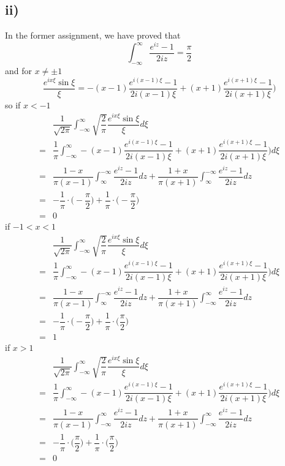 \documentclass[a4paper,12pt,titlepage]{article}
\begin{document}
\subsection*{ii)}
In the former assignment, we have proved that $$\int_{-\infty}^{\infty}\dfrac{e^{iz}-1}{2iz}=\dfrac{\pi}{2}$$
and for $x\neq\pm1$
$$\dfrac{e^{ix\xi}\sin\xi}{\xi}=-(x-1)\dfrac{e^{i(x-1)\xi}-1}{2i(x-1)\xi}+(x+1)\dfrac{e^{i(x+1)\xi
}-1}{2i(x+1)\xi})$$ 
so if $x<-1$
\begin{align*}
&\dfrac{1}{\sqrt{2\pi}}\int_{-\infty}^{\infty}\sqrt{\dfrac{2}{\pi}}\dfrac{e^{ix\xi}\sin\xi}{\xi}d\xi\\
=&\dfrac{1}{\pi}\int_{-\infty}^{\infty}-(x-1)\dfrac{e^{i(x-1)\xi}-1}{2i(x-1)\xi}+(x+1)\dfrac{e^{i(x+1)\xi
}-1}{2i(x+1)\xi})d\xi\\
=&\dfrac{1-x}{\pi(x-1)}\int_{\infty}^{-\infty}\dfrac{e^{iz}-1}{2iz}dz+\dfrac{1+x}{\pi(x+1)}\int_{\infty}^{-\infty}\dfrac{e^{iz}-1}{2iz}dz\\
=&-\dfrac{1}{\pi}\cdot\Big(-\dfrac{\pi}{2}\Big)+\dfrac{1}{\pi}\cdot\Big(-\dfrac{\pi}{2}\Big)\\
=&0
\end{align*}
if $-1<x<1$
\begin{align*}
&\dfrac{1}{\sqrt{2\pi}}\int_{-\infty}^{\infty}\sqrt{\dfrac{2}{\pi}}\dfrac{e^{ix\xi}\sin\xi}{\xi}d\xi\\
=&\dfrac{1}{\pi}\int_{-\infty}^{\infty}-(x-1)\dfrac{e^{i(x-1)\xi}-1}{2i(x-1)\xi}+(x+1)\dfrac{e^{i(x+1)\xi
}-1}{2i(x+1)\xi})d\xi\\
=&\dfrac{1-x}{\pi(x-1)}\int_{\infty}^{-\infty}\dfrac{e^{iz}-1}{2iz}dz+\dfrac{1+x}{\pi(x+1)}\int_{-\infty}^{\infty}\dfrac{e^{iz}-1}{2iz}dz\\
=&-\dfrac{1}{\pi}\cdot\Big(-\dfrac{\pi}{2}\Big)+\dfrac{1}{\pi}\cdot\Big(\dfrac{\pi}{2}\Big)\\
=&1
\end{align*}
if $x>1$
\begin{align*}
&\dfrac{1}{\sqrt{2\pi}}\int_{-\infty}^{\infty}\sqrt{\dfrac{2}{\pi}}\dfrac{e^{ix\xi}\sin\xi}{\xi}d\xi\\
=&\dfrac{1}{\pi}\int_{-\infty}^{\infty}-(x-1)\dfrac{e^{i(x-1)\xi}-1}{2i(x-1)\xi}+(x+1)\dfrac{e^{i(x+1)\xi
}-1}{2i(x+1)\xi})d\xi\\
=&\dfrac{1-x}{\pi(x-1)}\int_{-\infty}^{\infty}\dfrac{e^{iz}-1}{2iz}dz+\dfrac{1+x}{\pi(x+1)}\int_{-\infty}^{\infty}\dfrac{e^{iz}-1}{2iz}dz\\
=&-\dfrac{1}{\pi}\cdot\Big(\dfrac{\pi}{2}\Big)+\dfrac{1}{\pi}\cdot\Big(\dfrac{\pi}{2}\Big)\\
=&0
\end{align*}
\end{document}
